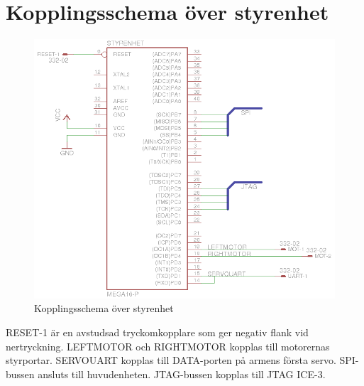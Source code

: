 \section{Kopplingsschema över styrenhet}

\begin{figure}[h]
\center
\includegraphics{styrenhet}
\caption{Kopplingsschema över styrenhet}
\end{figure}

RESET-1 är en avstudsad tryckomkopplare som ger negativ flank vid nertryckning. LEFTMOTOR och RIGHTMOTOR kopplas till motorernas styrportar. SERVOUART kopplas till DATA-porten på armens första servo. SPI-bussen ansluts till huvudenheten. JTAG-bussen kopplas till JTAG ICE-3.
